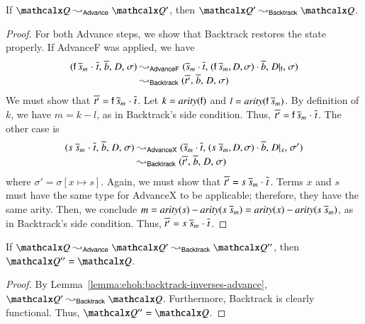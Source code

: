\begin{lemma}\label{lemma:ehoh:backtrack-inverses-advance} If $\quadruple \Pdtarrow_{\mathsf{Advance}} \quadruple'$, then
  $\quadruple' \Pdtarrow_{\mathsf{Backtrack}} \quadruple$.
  \end{lemma}
\begin{proof}
For both \textsf{Advance} steps, we show that \textsf{Backtrack} restores the state
properly. If \textsf{AdvanceF} was applied, we have
%
\begin{align*}
  ( \mathsf{f} \> \overline{s}_{m} \mathrel{\cdot} \overline{t}{,}\; \overline{b}{,}\; D{,}\; \sigma )
& \leadsto_{\mathsf{AdvanceF}}
  (\overline{s}_{m} \cdot \overline{t}{,}\;
      (\mathsf{f} \> \overline{s}_{m}, D, \sigma) \cdot \overline{b}{,}\; D{|}_{\mathsf{f}}{,}\; \sigma)
\\[-\jot]
& \leadsto_{\mathsf{Backtrack}}
  ( \overline{t'}{,}\; \overline{b}{,}\; D{,}\; \sigma )
\end{align*}
We must show that $\overline{t'} = \mathsf{f} \> \overline{s}_{m} \mathrel{\cdot} \overline{t}$.
Let $k = \textit{arity}(\mathsf{f})$ and $l = \textit{arity}(\mathsf{f} \> \overline{s}_{m})$.
By definition of $k$, we have $m = k - l$, as in \textsf{Backtrack}'s side
condition. Thus, $\overline{t'} = \mathsf{f} \> \overline{s}_{m} \mathrel{\cdot}
\overline{t}$. The other case is
\begin{align*}
  ( s \; \overline{s}_{m} \mathrel{\cdot} \overline{t}{,}\; \overline{b}{,}\; D{,}\; \sigma )
& \leadsto_{\mathsf{AdvanceX}}
  (\overline{s}_{m} \cdot \overline{t}{,}\; (s \; \overline{s}_{m}, D, \sigma) \cdot \overline{b}{,}\; D{|}_x{,}\; \sigma')
\\[-\jot]
& \leadsto_{\mathsf{Backtrack}}
  ( \overline{t'}{,}\; \overline{b}{,}\; D{,}\; \sigma )
\end{align*}
where $\sigma' = \sigma[x \mapsto s]$.
Again, we must show that $\overline{t'} = s \; \overline{s}_{m} \mathrel{\cdot} \overline{t}$. Terms
$x$ and $s$ must have the same type for \textsf{AdvanceX} to be applicable; therefore, they have the same arity. Then, we conclude $m=
\textit{arity}(s) - \textit{arity}(s \; \overline{s}_{m} ) =  \textit{arity}(x) - \textit{arity}(s \; \overline{s}_{m} )$, as in \textsf{Backtrack}'s
side condition. Thus, $\overline{t'} = s \; \overline{s}_{m} \mathrel{\cdot} \overline{t}$.
\end{proof}

\begin{lemma}\label{lemma:ehoh:advance-inverses-backtrack}
  If $\quadruple \Pdtarrow_{\mathsf{Advance}} \quadruple'
  \Pdtarrow_{\mathsf{Backtrack}} \quadruple''$, then
  $\quadruple'' = \quadruple$.
  \end{lemma}
\begin{proof}
  By Lemma~\ref{lemma:ehoh:backtrack-inverses-advance}, $\quadruple'
  \Pdtarrow_{\mathsf{Backtrack}} \quadruple$. Furthermore, \textsf{Backtrack} is
  clearly functional. Thus, $\quadruple'' = \quadruple$.
\end{proof}

